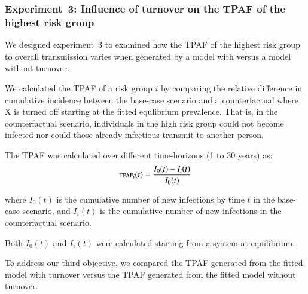 \subsubsection{Experiment~3: Influence of turnover on the TPAF of the highest risk group}
\label{sss:exp-tpaf}
We designed experiment~3 to examined how the TPAF of the 
highest risk group to overall transmission varies when generated
by a model with versus a model without turnover.

We calculated the TPAF of a risk group $i$ by comparing the relative difference in 
cumulative incidence between the base-case scenario and a 
counterfactual where X is turned off starting at the fitted equlibrium prevalence. 	%
That is, in the counterfactual scenario, individuals in the high risk group could not become 
infected nor could those already infectious transmit to another person.		%

The TPAF was calculated over different time-horizons (1 to 30 years) as:		%
\begin{equation}
\textsc{tpaf}_i(t) = \frac{I_0(t) - I_i(t)}{I_0(t)}							%
\end{equation}

where $I_0(t)$ is the cumulative number of new infections
by time $t$ in the base-case scenario,
and $I_i(t)$ is the cumulative number of new infections in the counterfactual scenario.

Both $I_0(t)$ and $I_i(t)$ were calculated					%
starting from a system at equilibrium.
\par
To address our third objective, we compared the TPAF generated from
the fitted model with turnover versus the TPAF generated from the 
fitted model without turnover.